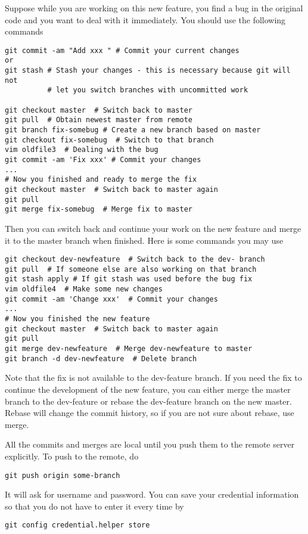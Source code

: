 \documentclass[runningheads,letterpaper]{llncs}
\begin{document}
Suppose while you are working on this new feature, you find a bug in the original code and
you want to deal with it immediately. You should use the following commands
\begin{verbatim}
git commit -am "Add xxx " # Commit your current changes
or
git stash # Stash your changes - this is necessary because git will not
          # let you switch branches with uncommitted work

git checkout master  # Switch back to master
git pull  # Obtain newest master from remote
git branch fix-somebug # Create a new branch based on master
git checkout fix-somebug  # Switch to that branch
vim oldfile3  # Dealing with the bug
git commit -am 'Fix xxx' # Commit your changes
...
# Now you finished and ready to merge the fix
git checkout master  # Switch back to master again
git pull
git merge fix-somebug  # Merge fix to master
\end{verbatim}

Then you can switch back and continue your work on the new feature and merge it to the master branch when finished.
Here is some commands you may use
\begin{verbatim}
git checkout dev-newfeature  # Switch back to the dev- branch
git pull  # If someone else are also working on that branch
git stash apply # If git stash was used before the bug fix
vim oldfile4  # Make some new changes
git commit -am 'Change xxx'  # Commit your changes
...
# Now you finished the new feature
git checkout master  # Switch back to master again
git pull
git merge dev-newfeature  # Merge dev-newfeature to master
git branch -d dev-newfeature  # Delete branch
\end{verbatim}

Note that the fix is not available to the dev-feature branch.
If you need the fix to continue the development of the new feature, you can either merge the master branch to the dev-feature or rebase the dev-feature branch on the new master.
Rebase will change the commit history, so if you are not sure about rebase, use merge.

All the commits and merges are local until you push them to the remote server explicitly.
To push to the remote, do
\begin{verbatim}
git push origin some-branch
\end{verbatim}
It will ask for username and password.
You can save your credential information so that you do not have to enter it every time by
\begin{verbatim}
git config credential.helper store
\end{verbatim}
\end{document}
